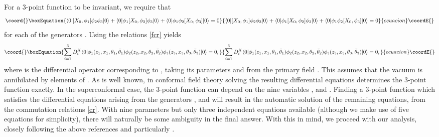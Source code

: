 \documentclass[a4paper,12pt]{article}
\def\thetabar    {\bar{\theta}}
\def\fsl         {sl(2|1;\mathbb C)}
\begin{document}
For a 3-point function to be \myHighlight{$\fsl$}\coordHE{} invariant, we require
that
\begin{equation}\coord{}\boxEquation{
\langle 0 | [X_0,\phi_1] \phi_2 \phi_3 | 0 \rangle + \langle
0 | \phi_1 [X_0,\phi_2] \phi_3 | 0 \rangle + \langle 0
| \phi_1 \phi_2 [X_0,\phi_3] | 0 \rangle =0
}{
\langle 0 | [X_0,\phi_1] \phi_2 \phi_3 | 0 \rangle + \langle
0 | \phi_1 [X_0,\phi_2] \phi_3 | 0 \rangle + \langle 0
| \phi_1 \phi_2 [X_0,\phi_3] | 0 \rangle =0
}{ecuacion}\coordE{}\end{equation}     
for each of the \myHighlight{$\fsl$}\coordHE{} generators \coordHE{}.  Using the relations
\eqref{fcr} yields
\begin{equation}\coord{}\boxEquation{
\label{des}
\sum_{i=1}^3 D^X_i \langle 0 | \phi_1 (z_1,x_1,\theta_1,\thetabar_1)
\phi_2 (z_2,x_2,\theta_2,\thetabar_2)
\phi_3(z_3,x_3,\theta_3,\thetabar_3) | 0 \rangle = 0,
}{
\sum_{i=1}^3 D^X_i \langle 0 | \phi_1 (z_1,x_1,\theta_1,\thetabar_1)
\phi_2 (z_2,x_2,\theta_2,\thetabar_2)
\phi_3(z_3,x_3,\theta_3,\thetabar_3) | 0 \rangle = 0,
}{ecuacion}\coordE{}\end{equation}
where \coordHE{} is the differential operator corresponding to \coordHE{},
taking its parameters \coordHE{} and \coordHE{} from the primary field
\coordHE{}.  This assumes that the vacuum \myHighlight{$| 0 \rangle$}\coordHE{} is
annihilated by elements of \myHighlight{$\fsl$}\coordHE{}.  As is well known, in conformal
field theory solving the resulting differential equations determines
the 3-point function exactly.  In the \coordHE{} superconformal
case, the 3-point function can depend on the nine variables \coordHE{},
\coordHE{} and \myHighlight{$\thetabar_i$}\coordHE{}.  Finding a 3-point function which
satisfies the differential equations arising from the generators
\coordHE{}, \coordHE{} and \coordHE{} will result in the automatic
solution of the remaining equations, from the commutation relations
\eqref{cr}.  With nine parameters but only three independent equations
available (although we make use of five equations for
simplicity), there will naturally be some ambiguity in the final answer. 
With this in mind, we proceed with our analysis, closely following the
above references and particularly \cite{West}.  
\end{document}
